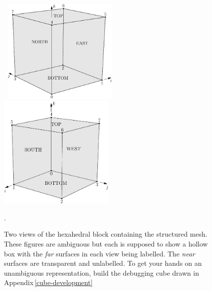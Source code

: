 \documentclass[12pt,a4paper,twoside]{article}
\begin{document}
 
\begin{figure}[htbp]
\mbox{
\includegraphics[width=0.5\textwidth]{figs/block3d-defn.pdf}
\includegraphics[width=0.5\textwidth]{figs/block3d-defn-2.pdf}
}
\caption{Two views of the hexahedral block containing the structured mesh.
    These figures are ambiguous but each is supposed to show a hollow box
    with the \textit{far} surfaces in each view being labelled.  
    The \textit{near} surfaces are transparent and unlabelled.
    To get your hands on an unambiguous representation, build the debugging cube
    drawn in Appendix\,\ref{cube-development}}.
\label{block-defn-fig}
\end{figure}
\end{document}

